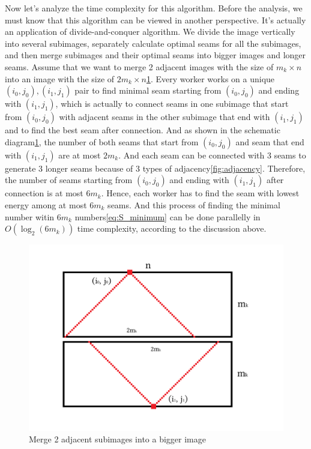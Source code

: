 \documentclass[final]{cvpr}
\begin{document}
Now let's analyze the time complexity for this algorithm.
Before the analysis, we must know that this algorithm can be viewed in another perspective.
It's actually an application of divide-and-conquer algorithm.
We divide the image vertically into several subimages, separately calculate optimal seams for all the subimages, and then merge subimages and their optimal seams into bigger images and longer seams.
Assume that we want to merge 2 adjacent images with the size of $m_k\times n$ into an image with the size of $2m_k\times n$\ref{fig:merge}.
Every worker works on a unique $(i_0,j_0),(i_1,j_1)$ pair to find minimal seam starting from $(i_0,j_0)$ and ending with $(i_1,j_1)$, which is actually to connect seams in one subimage that start from $(i_0,j_0)$ with adjacent seams in the other subimage that end with $(i_1,j_1)$ and to find the best seam after connection.
And as shown in the schematic diagram\ref{fig:merge}, the number of both seams that start from $(i_0,j_0)$ and seam that end with $(i_1,j_1)$ are at most $2m_k$.
And each seam can be connected with 3 seams to generate 3 longer seams because of 3 types of adjacency\ref{fig:adjacency}.
Therefore, the number of seams starting from $(i_0,j_0)$ and ending with $(i_1,j_1)$ after connection is at most $6m_k$.
Hence, each worker has to find the seam with lowest energy among at most $6m_k$ seams.
And this process of finding the minimal number witin $6m_k$ numbers\ref{eq:S_minimum} can be done parallelly in $O(\log_2(6m_k))$ time complexity, according to the discussion above.
\begin{figure}[htb]
\begin{center}
    \includegraphics[width=\linewidth]{merge.png}
\end{center}
\caption{Merge 2 adjacent subimages into a bigger image}
\label{fig:merge}
\end{figure}
\end{document}
